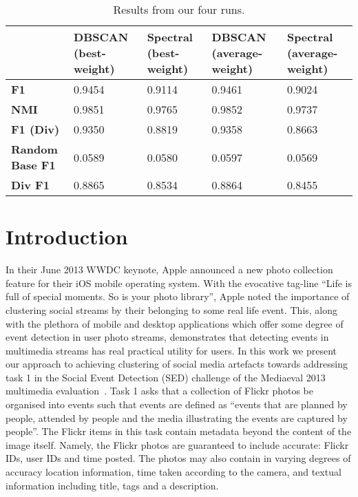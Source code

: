 \documentclass{../acm_proc_article-me11_tweaked}
\begin{document}
\begin{table*}[t!]
	\caption{\label{tab:results}Results from our four runs.}
\centering
    \begin{tabular}{|l||l|l|l|l|}
	\hline
    ~                  & \textbf{DBSCAN (best-weight)} &  \textbf{Spectral (best-weight)} & \textbf{DBSCAN (average-weight)} & \textbf{Spectral (average-weight)} \\
    \hline
    \hline
    \textbf{F1}                 & 0.9454        & 0.9114           & 0.9461           & 0.9024             \\
    \hline
    \textbf{NMI}                & 0.9851        & 0.9765           & 0.9852           & 0.9737             \\
    \hline
    \textbf{F1 (Div)}           & 0.9350        & 0.8819           & 0.9358           & 0.8663             \\
    \hline
    \textbf{Random Base F1} & 0.0589        & 0.0580           & 0.0597           & 0.0569             \\
    \hline
    \textbf{Div F1}             & 0.8865        & 0.8534           & 0.8864           & 0.8455             \\
	\hline
    \end{tabular}
\end{table*}
\section{Introduction}
In their June 2013 WWDC keynote, Apple announced a new photo collection feature for their iOS mobile operating system. With the evocative tag-line ``Life is full of special moments. So is your photo library'', Apple noted the importance of clustering social streams by their belonging to some real life event. This, along with the plethora of mobile and desktop applications which offer some degree of event detection in user photo streams, demonstrates that detecting events in multimedia streams has real practical utility for users. %
In this work we present our approach to achieving clustering of social media artefacts towards addressing task 1 in the Social Event Detection (SED) challenge of the Mediaeval 2013 multimedia evaluation~\cite{SED2013}. Task 1 asks that a collection of Flickr photos be organised into events such that events are defined as ``events that are planned by people, attended by people and the media illustrating the events are captured by people''. The Flickr items in this task contain metadata beyond the content of the image itself. Namely, the Flickr photos are guaranteed to include accurate: Flickr IDs, user IDs and time posted. The photos may also contain in varying degrees of accuracy location information, time taken according to the camera, and textual information including title, tags and a description. 
\end{document}
